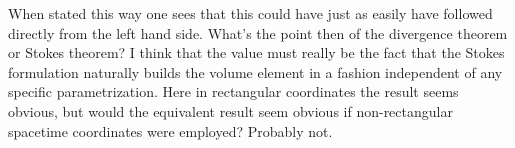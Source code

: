 When stated this way one sees that this could have just as easily have followed directly from the left hand side.  What's the point then of the divergence theorem or Stokes theorem?  I think that the value must really be the fact that the Stokes formulation naturally builds the volume element in a fashion independent of any specific parametrization.  Here in rectangular coordinates the result seems obvious, but would the equivalent result seem obvious if non-rectangular spacetime coordinates were employed?  Probably not.

\EndArticle
